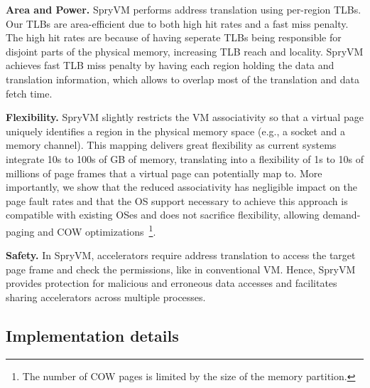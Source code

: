 \noindent\textbf{Area and Power.} SpryVM performs address translation using per-region TLBs. Our TLBs are area-efficient due to both high hit rates and a fast miss penalty. The high hit rates are because of having seperate TLBs being responsible for disjoint parts of the physical memory, increasing TLB reach and locality. SpryVM achieves fast TLB miss penalty by having each region holding the data and translation information, which allows to overlap most of the translation and data fetch time.


\noindent\textbf{Flexibility.} SpryVM slightly restricts the VM associativity so that a virtual page uniquely identifies a region in the physical memory space (e.g., a socket and a memory channel). This mapping delivers great flexibility as current systems integrate 10s to 100s of GB of memory, translating into a flexibility of 1s to 10s of millions of page frames that a virtual page can potentially map to. More importantly, we show that the reduced associativity has negligible impact on the page fault rates and that the OS support necessary to achieve this approach is compatible with existing OSes and does not sacrifice flexibility, allowing demand-paging and COW optimizations~\footnote{The number of COW pages is limited by the size of the memory partition.}.

\noindent\textbf{Safety.} In SpryVM, accelerators require address translation to access the target page frame and check the permissions, like in conventional VM. Hence, SpryVM provides protection for malicious and erroneous data accesses and facilitates sharing accelerators across multiple processes.

\subsection{Implementation details}
 


